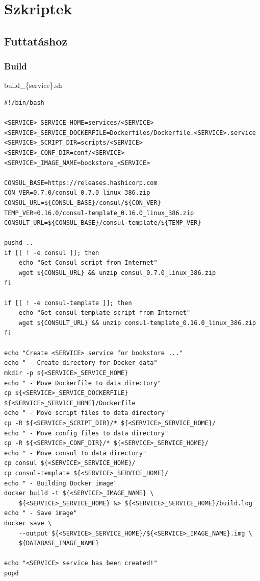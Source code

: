 \documentclass[11pt,magyar,a4paper,twoside,]{report}
\begin{document}
\section{Szkriptek}\label{szkriptek}

\subsection{Futtatáshoz}\label{futtatuxe1shoz}

\subsubsection{\texorpdfstring{Build\label{appendix-build}}{Build}}\label{build}

build\_\{service\}.sh

\begin{verbatim}
#!/bin/bash

<SERVICE>_SERVICE_HOME=services/<SERVICE>
<SERVICE>_SERVICE_DOCKERFILE=Dockerfiles/Dockerfile.<SERVICE>.service
<SERVICE>_SCRIPT_DIR=scripts/<SERVICE>
<SERVICE>_CONF_DIR=conf/<SERVICE>
<SERVICE>_IMAGE_NAME=bookstore_<SERVICE>

CONSUL_BASE=https://releases.hashicorp.com
CON_VER=0.7.0/consul_0.7.0_linux_386.zip
CONSUL_URL=${CONSUL_BASE}/consul/${CON_VER}
TEMP_VER=0.16.0/consul-template_0.16.0_linux_386.zip
CONSULT_URL=${CONSUL_BASE}/consul-template/${TEMP_VER}

pushd ..
if [[ ! -e consul ]]; then
    echo "Get Consul script from Internet"
    wget ${CONSUL_URL} && unzip consul_0.7.0_linux_386.zip
fi

if [[ ! -e consul-template ]]; then
    echo "Get consul-template script from Internet"
    wget ${CONSULT_URL} && unzip consul-template_0.16.0_linux_386.zip
fi

echo "Create <SERVICE> service for bookstore ..."
echo " - Create directory for Docker data"
mkdir -p ${<SERVICE>_SERVICE_HOME}
echo " - Move Dockerfile to data directory"
cp ${<SERVICE>_SERVICE_DOCKERFILE} ${<SERVICE>_SERVICE_HOME}/Dockerfile
echo " - Move script files to data directory"
cp -R ${<SERVICE>_SCRIPT_DIR}/* ${<SERVICE>_SERVICE_HOME}/
echo " - Move config files to data directory"
cp -R ${<SERVICE>_CONF_DIR}/* ${<SERVICE>_SERVICE_HOME}/
echo " - Move consul to data directory"
cp consul ${<SERVICE>_SERVICE_HOME}/
cp consul-template ${<SERVICE>_SERVICE_HOME}/
echo " - Building Docker image"
docker build -t ${<SERVICE>_IMAGE_NAME} \
    ${<SERVICE>_SERVICE_HOME} &> ${<SERVICE>_SERVICE_HOME}/build.log
echo " - Save image"
docker save \
    --output ${<SERVICE>_SERVICE_HOME}/${<SERVICE>_IMAGE_NAME}.img \
    ${DATABASE_IMAGE_NAME}

echo "<SERVICE> service has been created!"
popd
\end{verbatim}
\end{document}
